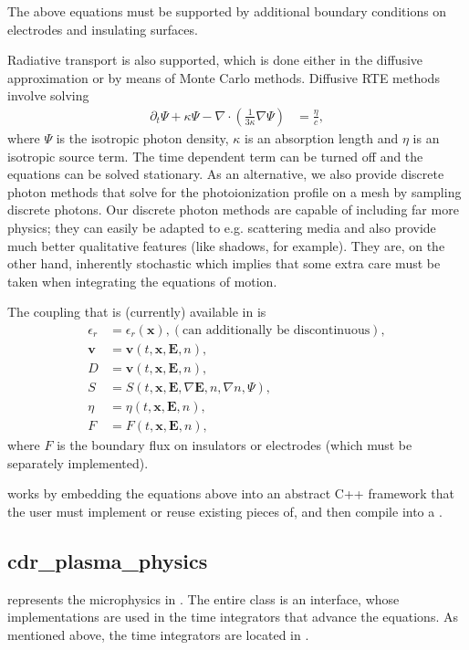 \documentclass[letterpaper,10pt,english]{sphinxmanual}
\begin{document}
The above equations must be supported by additional boundary conditions on electrodes and insulating surfaces.

Radiative transport is also supported, which is done either in the diffusive approximation or by means of Monte Carlo methods. Diffusive RTE methods involve solving
\begin{align}
   \partial_t\Psi + \kappa\Psi - \nabla\cdot\left(\frac{1}{3\kappa}\nabla\Psi\right) &= \frac{\eta}{c},
\end{align}
where \(\Psi\) is the isotropic photon density, \(\kappa\) is an absorption length and \(\eta\) is an isotropic source term.
The time dependent term can be turned off and the equations can be solved stationary.
As an alternative, we also provide discrete photon methods that solve for the photoionization profile on a mesh by sampling discrete photons.
Our discrete photon methods are capable of including far more physics; they can easily be adapted to e.g. scattering media and also provide much better qualitative features (like shadows, for example).
They are, on the other hand, inherently stochastic which implies that some extra care must be taken when integrating the equations of motion.

The coupling that is (currently) available in  is
\begin{align}
   \epsilon_r &= \epsilon_r(\mathbf{x}), (\textrm{can additionally be discontinuous}), \\[1ex]
   \mathbf{v} &= \mathbf{v}\left(t, \mathbf{x}, \mathbf{E}, n\right), \\[1ex]
   D &= \mathbf{v}\left(t, \mathbf{x}, \mathbf{E}, n\right), \\[1ex]
   S &= S(t, \mathbf{x}, \mathbf{E}, \nabla\mathbf{E}, n, \nabla n, \Psi), \\[1ex]
   \eta &= \eta\left(t, \mathbf{x}, \mathbf{E}, n\right), \\[1ex]
   F &= F(t, \mathbf{x}, \mathbf{E}, n),
\end{align}
where \(F\) is the boundary flux on insulators or electrodes (which must be separately implemented).

 works by embedding the equations above into an abstract C++ framework that the user must implement or reuse existing pieces of, and then compile into a .


\subsection{cdr\_plasma\_physics}
\label{\detokenize{MinimalPlasmaModel:cdr-plasma-physics}}\label{\detokenize{MinimalPlasmaModel:chap-cdr-plasma-physics}}
{\hyperref[\detokenize{MinimalPlasmaModel:chap-cdr-plasma-physics}]{}} represents the microphysics in .
The entire class is an interface, whose implementations are used in the time integrators that advance the equations.
As mentioned above, the time integrators are located in .
\end{document}

